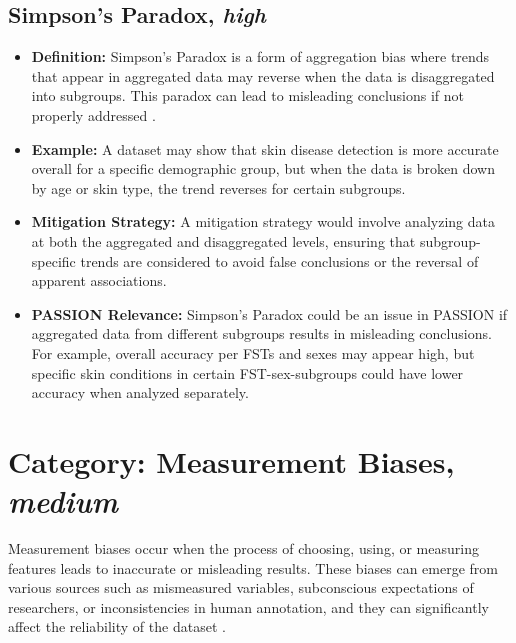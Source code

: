 \documentclass[12pt, a4paper, oneside]{book}   	%
\begin{document}
\begin{appendices}
		\subsection{Simpson's Paradox, \textit{high}}
		\begin{itemize}
			\item \textbf{Definition:} Simpson's Paradox is a form of aggregation bias where trends that appear in aggregated data may reverse when the data is disaggregated into subgroups. This paradox can lead to misleading conclusions if not properly addressed \autocite{Mehrabi_2021}.
			\item \textbf{Example:} A dataset may show that skin disease detection is more accurate overall for a specific demographic group, but when the data is broken down by age or skin type, the trend reverses for certain subgroups.
			\item \textbf{Mitigation Strategy:} A mitigation strategy would involve analyzing data at both the aggregated and disaggregated levels, ensuring that subgroup-specific trends are considered to avoid false conclusions or the reversal of apparent associations.
			\item \textbf{PASSION Relevance:} Simpson’s Paradox could be an issue in PASSION if aggregated data from different subgroups results in misleading conclusions. For example, overall accuracy per \glspl{FST} and sexes may appear high, but specific skin conditions in certain \gls{FST}-sex-subgroups could have lower accuracy when analyzed separately.
		\end{itemize}
		
		
		\section{Category: Measurement Biases, \textit{medium}} \label{biasCategoryMeasurementBiasesMedium}
		Measurement biases occur when the process of choosing, using, or measuring features leads to inaccurate or misleading results. These biases can emerge from various sources such as mismeasured variables, subconscious expectations of researchers, or inconsistencies in human annotation, and they can significantly affect the reliability of the dataset \autocite{Mehrabi_2021, M144_Suresh_2021}.
		

\end{appendices}
\end{document}
